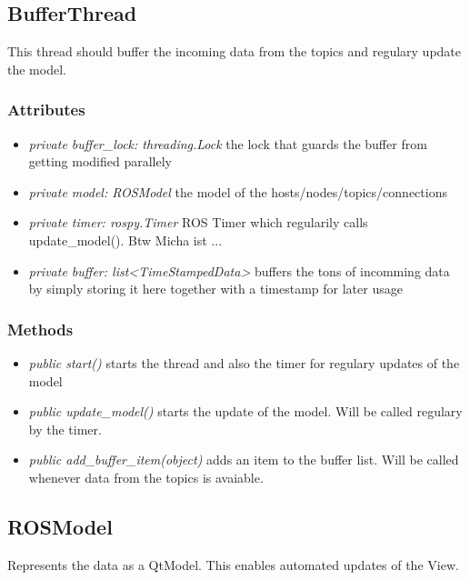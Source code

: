 \subsection{BufferThread}
This thread should buffer the incoming data from the topics and regulary update the model.
\subsubsection{Attributes}
\begin{itemize}
  \item \textit{private buffer\_lock: threading.Lock} the lock that guards the buffer from getting modified parallely
  \item \textit{private model: ROSModel} the model of the hosts/nodes/topics/connections 
  \item \textit{private timer: rospy.Timer} ROS Timer which regularily calls update\_model(). Btw Micha ist ...
  \item \textit{private buffer: list<TimeStampedData>} buffers the tons of incomming data by simply storing it here together with a timestamp for later usage
\end{itemize}
\subsubsection{Methods}
\begin{itemize}
  \item \textit{public start()} starts the thread and also the timer for regulary updates of the model
  \item \textit{public update\_model()} starts the update of the model. Will be called regulary by the timer.
  \item \textit{public add\_buffer\_item(object)} adds an item to the buffer list. Will be called whenever data from the topics is avaiable.
\end{itemize}

\subsection{ROSModel}
Represents the data as a QtModel. This enables automated updates of the View.
